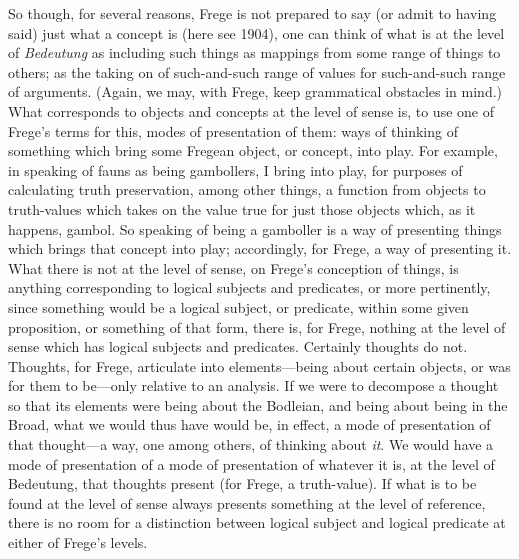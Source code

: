 So though, for several reasons, Frege is not prepared to say (or admit to having said) just what a concept is (here see 1904), one can think of what is at the level of \emph{Bedeutung} as including such things as mappings from some range of things to others; as the taking on of such-and-such range of values for such-and-such range of arguments. (Again, we may, with Frege, keep grammatical obstacles in mind.) What corresponds to objects and concepts at the level of sense is, to use one of Frege’s terms for this, modes of presentation of them: ways of thinking of something which bring some Fregean object, or concept, into play. For example, in speaking of fauns as being gambollers, I bring into play, for purposes of calculating truth preservation, among other things, a function from objects to truth-values which takes on the value true for just those objects which, as it happens, gambol. So speaking of being a gamboller is a way of presenting things which brings that concept into play; accordingly, for Frege, a way of presenting it. What there is not at the level of sense, on Frege’s conception of things, is anything corresponding to logical subjects and predicates, or more pertinently, since something would be a logical subject, or predicate, within some given proposition, or something of that form, there is, for Frege, nothing at the level of sense which has logical subjects and predicates. Certainly thoughts do not. Thoughts, for Frege, articulate into elements—being about certain objects, or was for them to be—only relative to an analysis. If we were to decompose a thought so that its elements were being about the Bodleian, and being about being in the Broad, what we would thus have would be, in effect, a mode of presentation of that thought—a way, one among others, of thinking about \emph{it}. We would have a mode of presentation of a mode of presentation of whatever it is, at the level of Bedeutung, that thoughts present (for Frege, a truth-value). If what is to be found at the level of sense always presents something at the level of reference, there is no room for a distinction between logical subject and logical predicate at either of Frege’s levels.

